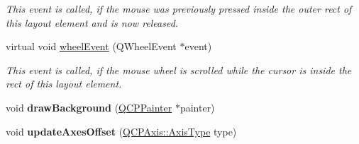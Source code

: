 \begin{DoxyCompactItemize}
\begin{DoxyCompactList}\small\item\em This event is called, if the mouse was previously pressed inside the outer rect of this layout element and is now released. \end{DoxyCompactList}\item 
\hypertarget{classQCPAxisRect_a5acf41fc30aa68ea263246ecfad85c31}{}virtual void \hyperlink{classQCPAxisRect_a5acf41fc30aa68ea263246ecfad85c31}{wheel\+Event} (Q\+Wheel\+Event $\ast$event)\label{classQCPAxisRect_a5acf41fc30aa68ea263246ecfad85c31}

\begin{DoxyCompactList}\small\item\em This event is called, if the mouse wheel is scrolled while the cursor is inside the rect of this layout element. \end{DoxyCompactList}\item 
\hypertarget{classQCPAxisRect_ab49d338d1ce74b476fcead5b32cf06dc}{}void {\bfseries draw\+Background} (\hyperlink{classQCPPainter}{Q\+C\+P\+Painter} $\ast$painter)\label{classQCPAxisRect_ab49d338d1ce74b476fcead5b32cf06dc}

\item 
\hypertarget{classQCPAxisRect_a6024ccdc74f5dc0e8a0fe482e5b28a20}{}void {\bfseries update\+Axes\+Offset} (\hyperlink{classQCPAxis_ae2bcc1728b382f10f064612b368bc18a}{Q\+C\+P\+Axis\+::\+Axis\+Type} type)\label{classQCPAxisRect_a6024ccdc74f5dc0e8a0fe482e5b28a20}

\end{DoxyCompactItemize}
